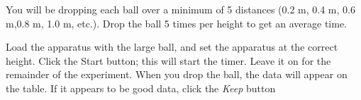   You will be dropping each ball over a minimum of 5 distances 
(0.2 m, 0.4 m, 0.6 m,0.8 m, 1.0 m, etc.). Drop the ball 5 times per height 
to get an average time.

  Load the apparatus with the large ball, and set the apparatus at the correct 
height. Click the Start button; this will start the timer. Leave it on 
for the remainder of the experiment. When you drop the ball, the data will 
appear on the table. If it appears to be good data, click the \emph{Keep} button


  
